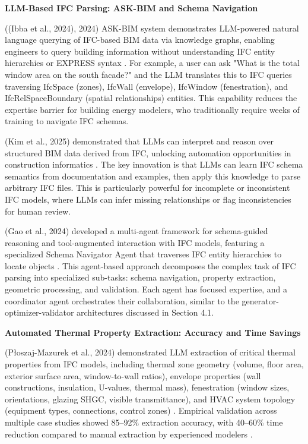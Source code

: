 \documentclass[12pt,a4paper]{article}
\begin{document}
\textbf{LLM-Based IFC Parsing: ASK-BIM and Schema Navigation}

((Ibba et al., 2024), 2024) ASK-BIM system demonstrates LLM-powered natural language querying of IFC-based BIM data via knowledge graphs, enabling engineers to query building information without understanding IFC entity hierarchies or EXPRESS syntax \cite{ref47}. For example, a user can ask "What is the total window area on the south facade?" and the LLM translates this to IFC queries traversing IfcSpace (zones), IfcWall (envelope), IfcWindow (fenestration), and IfcRelSpaceBoundary (spatial relationships) entities. This capability reduces the expertise barrier for building energy modelers, who traditionally require weeks of training to navigate IFC schemas.

(Kim et al., 2025) demonstrated that LLMs can interpret and reason over structured BIM data derived from IFC, unlocking automation opportunities in construction informatics \cite{ref48}. The key innovation is that LLMs can learn IFC schema semantics from documentation and examples, then apply this knowledge to parse arbitrary IFC files. This is particularly powerful for incomplete or inconsistent IFC models, where LLMs can infer missing relationships or flag inconsistencies for human review.

(Gao et al., 2024) developed a multi-agent framework for schema-guided reasoning and tool-augmented interaction with IFC models, featuring a specialized Schema Navigator Agent that traverses IFC entity hierarchies to locate objects \cite{ref49}. This agent-based approach decomposes the complex task of IFC parsing into specialized sub-tasks: schema navigation, property extraction, geometric processing, and validation. Each agent has focused expertise, and a coordinator agent orchestrates their collaboration, similar to the generator-optimizer-validator architectures discussed in Section 4.1.

\textbf{Automated Thermal Property Extraction: Accuracy and Time Savings}

(P\l{}oszaj-Mazurek et al., 2024) demonstrated LLM extraction of critical thermal properties from IFC models, including thermal zone geometry (volume, floor area, exterior surface area, window-to-wall ratios), envelope properties (wall constructions, insulation, U-values, thermal mass), fenestration (window sizes, orientations, glazing SHGC, visible transmittance), and HVAC system topology (equipment types, connections, control zones) \cite{ref50}. Empirical validation across multiple case studies showed 85--92\% extraction accuracy, with 40--60\% time reduction compared to manual extraction by experienced modelers \cite{ref51}.
\end{document}
